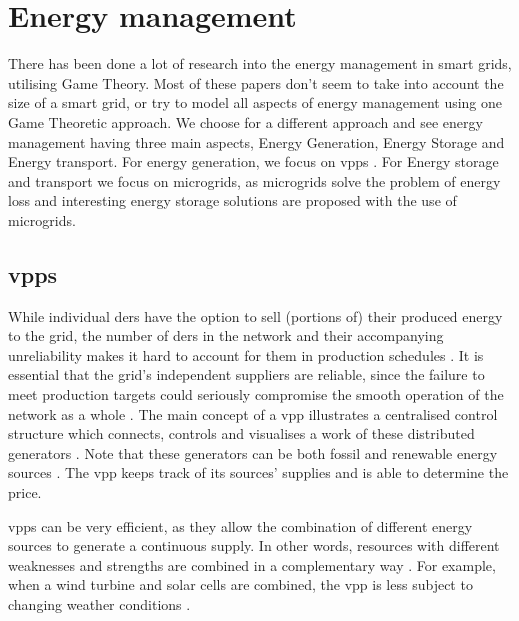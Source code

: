 \section{Energy management}\label{Energy-Management}
There has been done a lot of research into the energy management in smart grids, utilising Game Theory\cite{WangOuyangKrishnanEtAl2015, TusharZhangSmithEtAl2013}. Most of these papers don't seem to take into account the size of a smart grid, or try to model all aspects of energy management using one Game Theoretic approach. We choose for a different approach and see energy management having three main aspects, Energy Generation, Energy Storage and Energy transport. For energy generation, we focus on \acp{vpp} . For Energy storage and transport we focus on microgrids, as microgrids solve the problem of energy loss and interesting energy storage solutions are proposed with the use of microgrids.

\subsection{\aclp{vpp}}
While individual \acp{der} have the option to sell (portions of) their produced energy to the grid, the number of \acp{der} in the network and their accompanying unreliability makes it hard to account for them in production schedules \cite{RobuKotaChalkiadakisEtAl2012}. It is essential that the grid's independent suppliers are reliable, since the failure to meet production targets could seriously compromise the smooth operation of the network as a whole \cite{ChalkiadakisRobuKotaEtAl2011}. The main concept of a \ac{vpp} illustrates a centralised control structure which connects, controls and visualises a work of these distributed generators \cite{NikonowiczMilewski2012}. Note that these generators can be both fossil and renewable energy sources \cite{LombardiPowalkoRudion2009}. The \ac{vpp} keeps track of its sources' supplies and is able to determine the price. 

\acp{vpp} can be very efficient, as they allow the combination of different energy sources to generate a continuous supply. In other words, resources with different weaknesses and strengths are combined in a complementary way \cite{Koeppel2003}. For example, when a wind turbine and solar cells are combined, the \ac{vpp} is less subject to changing weather conditions \cite{Tromly2001, Kumagai2012, MashhourMoghaddas-Tafreshi2011, NikonowiczMilewski2012}. 

